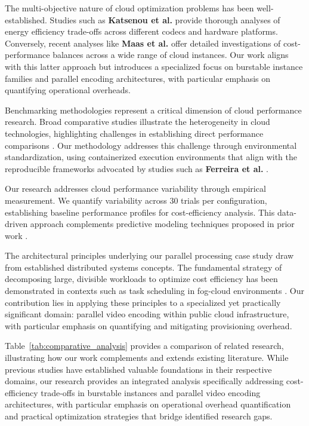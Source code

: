 \documentclass[conference]{IEEEtran}
\begin{document}
	The multi-objective nature of cloud optimization problems has been well-established. Studies such as \textbf{Katsenou et al.} \cite{b8} provide thorough analyses of energy efficiency trade-offs across different codecs and hardware platforms. Conversely, recent analyses like \textbf{Maas et al.} \cite{b1} offer detailed investigations of cost-performance balances across a wide range of cloud instances. Our work aligns with this latter approach but introduces a specialized focus on burstable instance families and parallel encoding architectures, with particular emphasis on quantifying operational overheads.
	
	Benchmarking methodologies represent a critical dimension of cloud performance research. Broad comparative studies illustrate the heterogeneity in cloud technologies, highlighting challenges in establishing direct performance comparisons \cite{b18, b1}. Our methodology addresses this challenge through environmental standardization, using containerized execution environments that align with the reproducible frameworks advocated by studies such as \textbf{Ferreira et al.} \cite{b9}.
	
	Our research addresses cloud performance variability through empirical measurement. We quantify variability across 30 trials per configuration, establishing baseline performance profiles for cost-efficiency analysis. This data-driven approach complements predictive modeling techniques proposed in prior work \cite{b10, b11}.
	
	The architectural principles underlying our parallel processing case study draw from established distributed systems concepts. The fundamental strategy of decomposing large, divisible workloads to optimize cost efficiency has been demonstrated in contexts such as task scheduling in fog-cloud environments \cite{b12, b13}. Our contribution lies in applying these principles to a specialized yet practically significant domain: parallel video encoding within public cloud infrastructure, with particular emphasis on quantifying and mitigating provisioning overhead.
	
	Table~\ref{tab:comparative_analysis} provides a comparison of related research, illustrating how our work complements and extends existing literature. While previous studies have established valuable foundations in their respective domains, our research provides an integrated analysis specifically addressing cost-efficiency trade-offs in burstable instances and parallel video encoding architectures, with particular emphasis on operational overhead quantification and practical optimization strategies that bridge identified research gaps.
	
\end{document}
